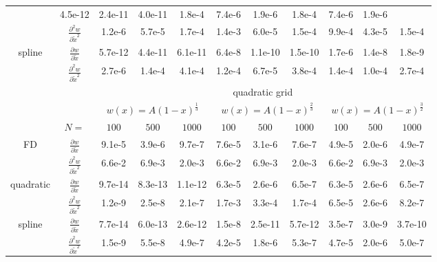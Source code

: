 \begin{tabular}{cc|c|c|c|c|c|c|c|c|c|}
  &4.5e-12  &2.4e-11  &4.0e-11  &1.8e-4  &7.4e-6  &1.9e-6  &1.8e-4  &7.4e-6  &1.9e-6
\\ \cline{2-11}
\multicolumn{1}{|c|}{}                        &
\multicolumn{1}{|c|}{$\frac{\partial^2 w}{\partial \tilde x^2}$}
  &1.2e-6  &5.7e-5  &1.7e-4  &1.4e-3  &6.0e-5  &1.5e-4  &9.9e-4  &4.3e-5  &1.5e-4
\\ \cline{1-11}
\multicolumn{1}{|c|}{\multirow{2}{*}{spline}} &
\multicolumn{1}{|c|}{$\frac{\partial w}{\partial \tilde x}$}
  &5.7e-12  &4.4e-11  &6.1e-11  &6.4e-8  &1.1e-10  &1.5e-10  &1.7e-6  &1.4e-8  &1.8e-9
\\ \cline{2-11}
\multicolumn{1}{|c|}{}                        &
\multicolumn{1}{|c|}{$\frac{\partial^2 w}{\partial \tilde x^2}$}
  &2.7e-6  &1.4e-4  &4.1e-4  &1.2e-4  &6.7e-5  &3.8e-4  &1.4e-4  &1.0e-4  &2.7e-4
\\ \cline{1-11}
& & \multicolumn{9}{|c|}{quadratic grid}
\\ \cline{3-11}
& & \multicolumn{3}{|c|}{$w(x)=A(1-x)^\frac{1}{3}$} &  \multicolumn{3}{|c|}{$w(x)=A(1-x)^\frac{2}{3}$} &  \multicolumn{3}{|c|}{$w(x)=A(1-x)^\frac{3}{2}$}
\\ \cline{2-11}
& \multicolumn{1}{|c|}{$N=$} & $100$ & $500$ & $1000$ & $100$ & $500$ & $1000$ & $100$ & $500$ & $1000$
\\ \cline{1-11}
\multicolumn{1}{|c|}{\multirow{2}{*}{FD}} &
\multicolumn{1}{|c|}{$\frac{\partial w}{\partial \tilde x}$}
  &9.1e-5  &3.9e-6  &9.7e-7  &7.6e-5  &3.1e-6  &7.6e-7  &4.9e-5  &2.0e-6  &4.9e-7
\\ \cline{2-11}
\multicolumn{1}{|c|}{}                        &
\multicolumn{1}{|c|}{$\frac{\partial^2 w}{\partial \tilde x^2}$}
  &6.6e-2  &6.9e-3  &2.0e-3  &6.6e-2  &6.9e-3  &2.0e-3  &6.6e-2  &6.9e-3  &2.0e-3
\\ \cline{1-11}
\multicolumn{1}{|c|}{\multirow{2}{*}{quadratic}} &
\multicolumn{1}{|c|}{$\frac{\partial w}{\partial \tilde x}$}
  &9.7e-14  &8.3e-13  &1.1e-12  &6.3e-5  &2.6e-6  &6.5e-7  &6.3e-5  &2.6e-6  &6.5e-7
\\ \cline{2-11}
\multicolumn{1}{|c|}{}                        &
\multicolumn{1}{|c|}{$\frac{\partial^2 w}{\partial \tilde x^2}$}
  &1.2e-9  &2.5e-8  &2.1e-7  &1.7e-3  &3.3e-4  &1.7e-4  &6.5e-5  &2.6e-6  &8.2e-7
\\ \cline{1-11}
\multicolumn{1}{|c|}{\multirow{2}{*}{spline}} &
\multicolumn{1}{|c|}{$\frac{\partial w}{\partial \tilde x}$}
  &7.7e-14  &6.0e-13  &2.6e-12  &1.5e-8  &2.5e-11  &5.7e-12  &3.5e-7  &3.0e-9  &3.7e-10
\\ \cline{2-11}
\multicolumn{1}{|c|}{}                        &
\multicolumn{1}{|c|}{$\frac{\partial^2 w}{\partial \tilde x^2}$}
  &1.5e-9  &5.5e-8  &4.9e-7  &4.2e-5  &1.8e-6  &5.3e-7  &4.7e-5  &2.0e-6  &5.0e-7
\\ \cline{1-11}
\end{tabular}
